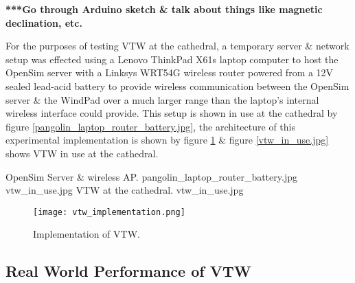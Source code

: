 \textbf{***Go through Arduino sketch \& talk about things like magnetic declination, etc.}




For the purposes of testing VTW at the cathedral, a temporary server \& network setup was effected using a Lenovo ThinkPad X61s\thinkpadFootnote{} laptop computer to host the OpenSim server with a Linksys WRT54G\wrtFootnote{} wireless router powered from a 12V sealed lead-acid battery to provide wireless communication between the OpenSim server \& the WindPad over a much larger range than the laptop's internal wireless interface could provide. This setup is shown in use at the cathedral by figure \ref{pangolin_laptop_router_battery.jpg}, the architecture of this experimental implementation is shown by figure \ref{vtw_implementation.png} \& figure \ref{vtw_in_use.jpg} shows VTW in use at the cathedral.

 {OpenSim Server \& wireless AP.} {pangolin_laptop_router_battery.jpg}
       {vtw_in_use.jpg} {VTW at the cathedral.} {vtw_in_use.jpg}

\begin{figure}[h]
\centering
  \texttt{[image: vtw\_implementation.png]}
  \caption{Implementation of VTW.}
  \label{vtw_implementation.png}
\end{figure}


\subsection{Real World Performance of VTW}

\newcommand{\ubloxcepFootnote}{\footnote{\url{https://u-blox.com/images/downloads/Product_Docs/MAX-6_ProductSummary_(GPS.G6-HW-10089).pdf}}}

